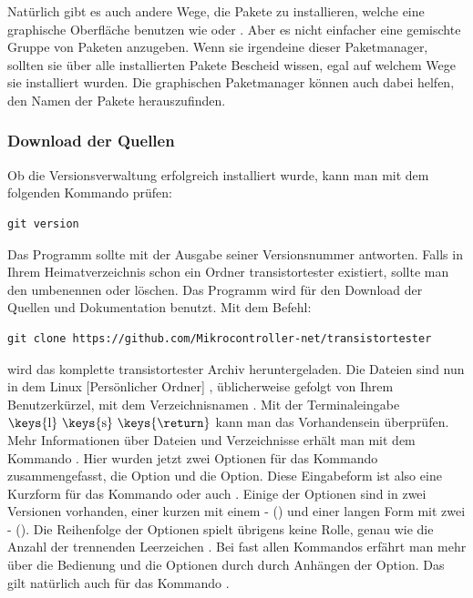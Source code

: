 Natürlich gibt es auch andere Wege, die Pakete zu installieren, welche eine graphische Oberfläche benutzen
wie  oder . Aber es nicht einfacher eine gemischte Gruppe von Paketen anzugeben.
Wenn sie irgendeine dieser Paketmanager, sollten sie über alle installierten Pakete Bescheid wissen,
egal auf welchem Wege sie installiert wurden.
Die graphischen Paketmanager können auch dabei helfen, den Namen der Pakete herauszufinden.

\subsubsection{Download der Quellen}

Ob die Versionsverwaltung  erfolgreich installiert wurde,
kann man mit dem folgenden Kommando prüfen:
\begin{large} \vspace{-0.4em} \begin{verbatim}
git version
\end{verbatim} \end{large}
Das  Programm sollte mit der Ausgabe seiner Versionsnummer antworten.
Falls in Ihrem Heimatverzeichnis schon ein Ordner transistortester existiert,
sollte man den umbenennen oder löschen.
Das Programm  wird für den Download der Quellen und Dokumentation benutzt.
Mit dem Befehl:
\begin{large} \vspace{-0.4em} \begin{verbatim}
git clone https://github.com/Mikrocontroller-net/transistortester
\end{verbatim} \end{large}
wird das komplette transistortester Archiv heruntergeladen.
Die Dateien sind nun in dem Linux [Persönlicher Ordner] , üblicherweise  gefolgt
von Ihrem Benutzerkürzel, mit dem  Verzeichnisnamen .
Mit der Terminaleingabe   \(\mbox{\keys{l} \keys{s} \keys{\return}}\) kann man
das Vorhandensein überprüfen.
Mehr Informationen über Dateien und Verzeichnisse erhält man mit
dem Kommando . Hier wurden jetzt zwei Optionen für das Kommando  zusammengefasst,
die  Option und die  Option. Diese Eingabeform ist also eine Kurzform für
das Kommando  oder auch .
Einige der Optionen sind in zwei Versionen vorhanden, einer kurzen mit einem - ()
und einer langen Form mit zwei - ().
Die Reihenfolge der Optionen spielt übrigens keine Rolle,
genau wie die Anzahl der trennenden Leerzeichen \keys{\space}.
Bei fast allen Kommandos erfährt man mehr über die Bedienung und die Optionen
durch durch Anhängen der  Option.
Das gilt natürlich auch für das Kommando .\\

